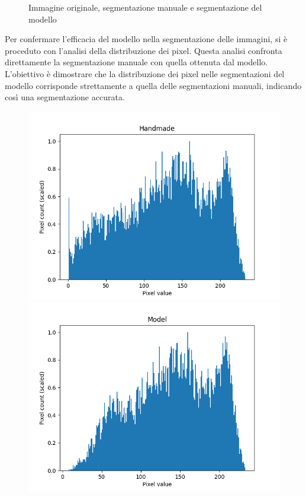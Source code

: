 \begin{figure}[!ht]
	\caption{Immagine originale, segmentazione manuale e segmentazione del modello}
	\label{fig:risultati_quantitativi}
\end{figure}




Per confermare l'efficacia del modello nella segmentazione delle immagini, si è proceduto con
l'analisi della distribuzione dei pixel. Questa analisi confronta direttamente la segmentazione
manuale con quella ottenuta dal modello. L'obiettivo è dimostrare che la distribuzione dei pixel
nelle segmentazioni del modello corrisponde strettamente a quella delle segmentazioni manuali,
indicando così una segmentazione accurata.


\begin{figure}[!ht]
	\centering
	\begin{minipage}{0.32\textwidth}
		\centering
		\includegraphics[width=\linewidth]{Immagini/handmade_scaled_hist.png}
	\end{minipage}
	\hfill %
	\begin{minipage}{0.32\textwidth}
		\centering
		\includegraphics[width=\linewidth]{Immagini/model_scaled_hist.png}

\end{minipage}
\end{figure}
